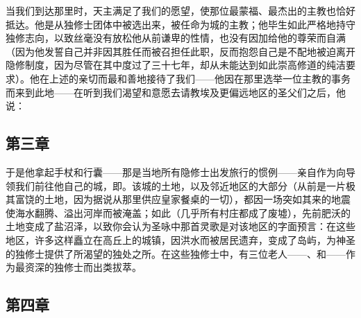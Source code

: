 \par

当我们到达那里时，天主满足了我们的愿望，使那位最蒙福、最杰出的主教也恰好抵达。他是从独修士团体中被选出来，被任命为城的主教；他毕生如此严格地持守独修志向，以致丝毫没有放松他从前谦卑的性情，也没有因加给他的尊荣而自满（因为他发誓自己并非因其胜任而被召担任此职，反而抱怨自己是不配地被迫离开隐修制度，因为尽管在其中度过了三十七年，却从未能达到如此崇高修道的纯洁要求）。他在上述的亲切而最和善地接待了我们——他因在那里选举一位主教的事务而来到此地——在听到我们渴望和意愿去请教埃及更偏远地区的圣父们之后，他说：\par


\subsection{第三章}

\par

于是他拿起手杖和行囊——那是当地所有隐修士出发旅行的惯例——亲自作为向导领我们前往他自己的城，即。该城的土地，以及邻近地区的大部分（从前是一片极其富饶的土地，因为据说从那里供应皇家餐桌的一切），都因一场突如其来的地震使海水翻腾、溢出河岸而被淹盖；如此（几乎所有村庄都成了废墟），先前肥沃的土地变成了盐沼泽，以致你会认为圣咏中那首灵歌是对该地区的字面预言：在这些地区，许多这样矗立在高丘上的城镇，因洪水而被居民遗弃，变成了岛屿，为神圣的独修士提供了所渴望的独处之所。在这些独修士中，有三位老人——、和——作为最资深的独修士而出类拔萃。\par


\subsection{第四章}

